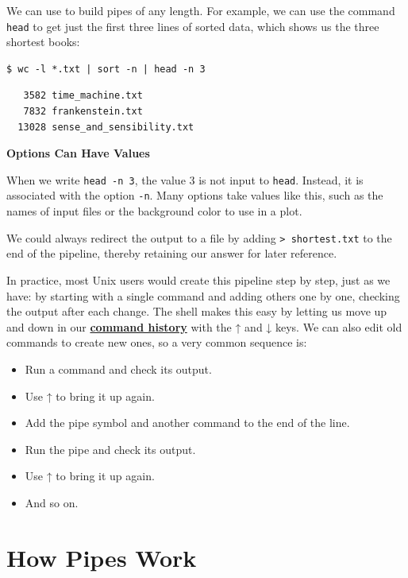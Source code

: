 \documentclass[
]{krantz}
\providecommand{\tightlist}{%
  \setlength{\itemsep}{0pt}\setlength{\parskip}{0pt}}
\renewenvironment{quote}{\begin{VF}}{\end{VF}}
\newcommand{\gref}[2]{\hyperlink{#2}{\textbf{#1}}}
\begin{document}
We can use \texttt{\textbar{}} to build pipes of any length.
For example,
we can use the command \texttt{head} to get just the first three lines of sorted data,
which shows us the three shortest books:

\begin{verbatim}
$ wc -l *.txt | sort -n | head -n 3
\end{verbatim}

\begin{verbatim}
   3582 time_machine.txt
   7832 frankenstein.txt
  13028 sense_and_sensibility.txt
\end{verbatim}

\begin{quote}
\textbf{Options Can Have Values}

When we write \texttt{head\ -n\ 3},
the value 3 is not input to \texttt{head}.
Instead, it is associated with the option \texttt{-n}.
Many options take values like this,
such as the names of input files or the background color to use in a plot.
\end{quote}

We could always redirect the output to a file
by adding \texttt{\textgreater{}\ shortest.txt} to the end of the pipeline,
thereby retaining our answer for later reference.

In practice,
most Unix users would create this pipeline step by step,
just as we have:
by starting with a single command and adding others one by one,
checking the output after each change.
The shell makes this easy
by letting us move up and down in our \gref{command history}{command\_history}
with the ↑ and ↓ keys.
We can also edit old commands to create new ones,
so a very common sequence is:

\begin{itemize}
\tightlist
\item
  Run a command and check its output.
\item
  Use ↑ to bring it up again.
\item
  Add the pipe symbol \texttt{\textbar{}} and another command to the end of the line.
\item
  Run the pipe and check its output.
\item
  Use ↑ to bring it up again.
\item
  And so on.
\end{itemize}

\hypertarget{bash-tools-stdio}{%
\section{How Pipes Work}\label{bash-tools-stdio}}
\end{document}
